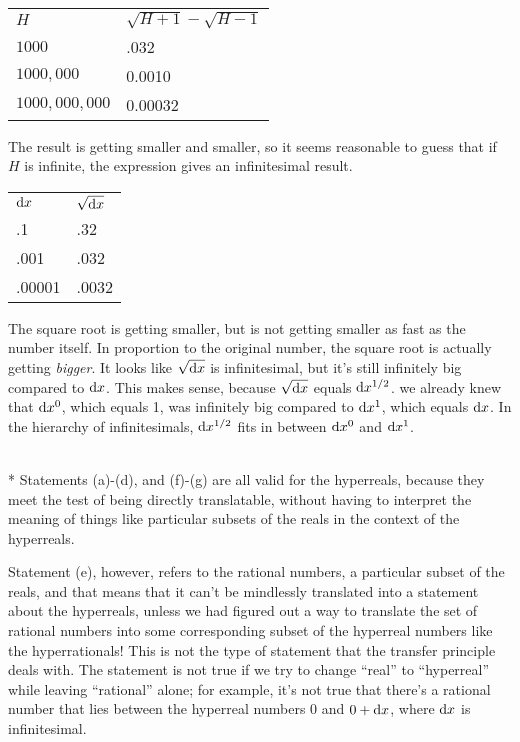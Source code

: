 
\begin{tabular}{ll}
$H$ & $\sqrt{H+1}-\sqrt{H-1}$ \\
$1000$ & .032 \\
$1000,000$ & 0.0010 \\
$1000,000,000$ & 0.00032 
\end{tabular}

The result is getting smaller and smaller, so it seems reasonable to guess that if $H$ is infinite,
the expression gives an infinitesimal result.


\begin{tabular}{ll}
$\textup{d} x$ & $\sqrt{\textup{d} x}$ \\
.1 & .32 \\
.001 & .032 \\
.00001 & .0032
\end{tabular}

The square root is getting smaller, but is not getting smaller as fast as the number itself.
In proportion to the original number, the square root is actually getting \emph{bigger}. It
looks like $\sqrt{\textup{d} x}$ is infinitesimal, but it's still infinitely big compared to
$\textup{d} x$. This makes sense, because $\sqrt{\textup{d} x}$ equals $\textup{d} x^{1/2}$.
we already knew that $\textup{d} x^0$, which equals 1, was
infinitely big compared to $\textup{d} x^1$, which equals $\textup{d} x$.
In the hierarchy of infinitesimals, $\textup{d} x^{1/2}$ fits in between $\textup{d} x^0$
and  $\textup{d} x^1$.

\\*
Statements (a)-(d), and (f)-(g) are all valid for the hyperreals, because they meet the test of being
directly translatable, without having to interpret the meaning of things like particular
subsets of the reals in the context of the hyperreals.

Statement (e), however, refers to the
rational numbers, a particular subset of the reals, and that means that it can't be
mindlessly translated into a statement about the hyperreals, unless we had figured out
a way to translate the set of rational numbers into some corresponding subset of the
hyperreal numbers like the hyperrationals! This is not the type of statement that the
transfer principle deals with. The statement is not true if we try to change ``real''
to ``hyperreal'' while leaving ``rational'' alone; for example, it's not true that there's
a rational number that lies between the hyperreal numbers 0 and $0+\textup{d} x$, where $\textup{d} x$
is infinitesimal.

